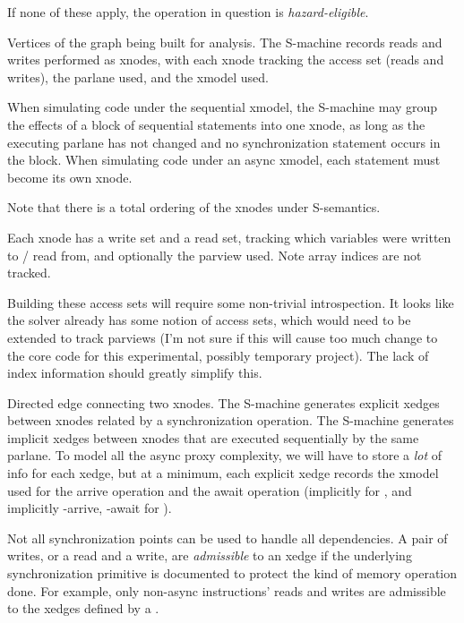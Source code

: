 If none of these apply, the operation in question is \textit{hazard-eligible}.

\filbreak
{}
Vertices of the graph being built for analysis.
The S-machine records reads and writes performed as xnodes, with each xnode tracking the access set (reads and writes), the parlane used, and the xmodel used.

When simulating code under the sequential xmodel, the S-machine may group the effects of a block of sequential statements into one xnode, as long as the executing parlane has not changed and no synchronization statement occurs in the block. When simulating code under an async xmodel, each statement must become its own xnode.

Note that there is a total ordering of the xnodes under S-semantics.

\filbreak
{} Each xnode has a write set and a read set, tracking which variables were written to / read from, and optionally the parview used.
Note array indices are not tracked.

 Building these access sets will require some non-trivial introspection.
It looks like the solver already has some notion of access sets, which would need to be extended to track parviews (I'm not sure if this will cause too much change to the core code for this experimental, possibly temporary project).
The lack of index information should greatly simplify this.

\filbreak
{} Directed edge connecting two xnodes.
The S-machine generates explicit xedges between xnodes related by a synchronization operation.
The S-machine generates implicit xedges between xnodes that are executed sequentially by the same parlane.
To model all the async proxy complexity, we will have to store a \textit{lot} of info for each xedge, but at a minimum, each explicit xedge records the xmodel used for the arrive operation and the await operation (implicitly  for , and implicitly -arrive, -await for ).

\filbreak
{} Not all synchronization points can be used to handle all dependencies.
A pair of writes, or a read and a write, are \textit{admissible} to an xedge if the underlying synchronization primitive is documented to protect the kind of memory operation done. For example, only non-async instructions' reads and writes are admissible to the xedges defined by a .

